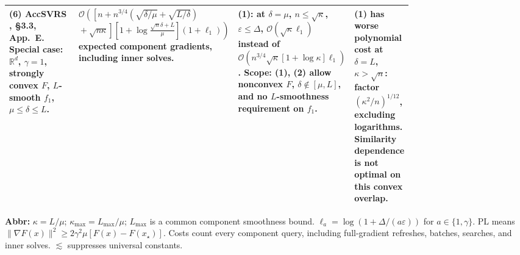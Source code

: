 \begin{table}[tp]
\begin{threeparttable}
\begin{tabularx}{\linewidth}{@{}>{\raggedright\arraybackslash}p{0.20\linewidth}>{\raggedright\arraybackslash}p{0.32\linewidth}>{\raggedright\arraybackslash}p{0.25\linewidth}>{\raggedright\arraybackslash}X@{}}
\midrule
\textbf{(6)} AccSVRS \citep{csqLin2023v2}, \S3.3, App.~E. Special case: $\mathbb{R}^d$, $\gamma=1$, strongly convex $F$, $L$-smooth $f_1$, $\mu\le\delta\le L$.
& $\mathcal{O}\!\left(\left[n+n^{3/4}\left(\sqrt{\delta/\mu}+\sqrt{L/\delta}\right)\right.\right.$\newline
$\left.\left.{}+\sqrt{n\kappa}\right]\left[1+\log\frac{\sqrt n\delta+L}{\mu}\right](1+\ell_1)\right)$ expected component gradients, including inner solves.
& \textbf{(1)}: at $\delta=\mu$, $n\le\sqrt\kappa$, $\varepsilon\le\Delta$, $\mathcal{O}(\sqrt\kappa\ell_1)$ instead of $\mathcal{O}(n^{3/4}\sqrt\kappa[1+\log\kappa]\ell_1)$. Scope: \textbf{(1)}, \textbf{(2)} allow nonconvex $F$, $\delta\notin[\mu,L]$, and no $L$-smoothness requirement on $f_1$.
& \textbf{(1)} has worse polynomial cost at $\delta=L$, $\kappa>\sqrt n$: factor $(\kappa^2/n)^{1/12}$, excluding logarithms. Similarity dependence is not optimal on this convex overlap. \\
\bottomrule
\end{tabularx}
\begin{tablenotes}[flushleft]\footnotesize
\item[] \textbf{Abbr:} $\kappa=L/\mu$; $\kappa_{\max}=L_{\max}/\mu$; $L_{\max}$ is a common component smoothness bound. $\ell_a=\log(1+\Delta/(a\varepsilon))$ for $a\in\{1,\gamma\}$. PL means $\|\nabla F(x)\|^2\ge2\gamma^2\mu[F(x)-F(x_\star)]$. Costs count every component query, including full-gradient refreshes, batches, searches, and inner solves. $\lesssim$ suppresses universal constants.
\end{tablenotes}
\end{threeparttable}
\end{table}
\clearpage
